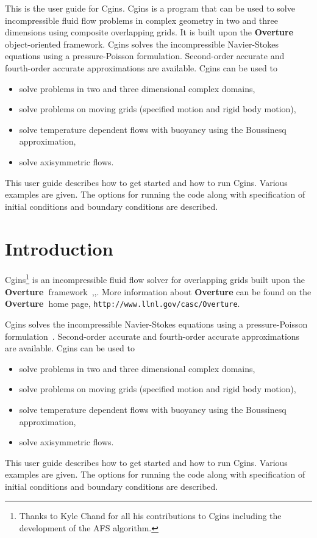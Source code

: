 \documentclass{article}
\newcommand{\Overture}{{\bf Overture\ }}
\begin{document}
\begin{flushleft}
This is the user guide for Cgins.  Cgins is a program that can be used to solve
incompressible fluid flow problems in complex geometry in two and three
dimensions using composite overlapping grids. It is built upon the \Overture
object-oriented framework.  Cgins solves the incompressible Navier-Stokes
equations using a pressure-Poisson formulation. Second-order accurate and
fourth-order accurate approximations are available.  Cgins can be used to
\begin{itemize}
  \item solve problems in two and three dimensional complex domains,
  \item solve problems on moving grids (specified motion and rigid body motion), 
  \item solve temperature dependent flows with buoyancy using the Boussinesq approximation,  
  \item solve axisymmetric flows.
\end{itemize} 
This user guide describes how to get started and how to run Cgins. Various examples are given.
The options for running the code along with specification of initial conditions and
boundary conditions are described.

\end{flushleft}

\clearpage
\tableofcontents

\clearpage
\section{Introduction}

Cgins\footnote{Thanks to Kyle Chand for all his contributions to Cgins including
the development of the AFS algorithm.} is an incompressible fluid flow solver for overlapping grids built upon
the \Overture framework~\cite{Brown97},\cite{Henshaw96a},\cite{iscope97}.
More information about
{\bf Overture} can be found on the \Overture home page, {\tt http://www.llnl.gov/\-casc/\-Overture}.


Cgins
solves the incompressible Navier-Stokes
equations using a pressure-Poisson formulation~\cite{ICSSI}. Second-order accurate and
fourth-order accurate approximations are available.  Cgins can be used to
\begin{itemize}
  \item solve problems in two and three dimensional complex domains,
  \item solve problems on moving grids (specified motion and rigid body motion), 
  \item solve temperature dependent flows with buoyancy using the Boussinesq approximation,  
  \item solve axisymmetric flows.
\end{itemize} 
This user guide describes how to get started and how to run Cgins. Various examples are given.
The options for running the code along with specification of initial conditions and
boundary conditions are described.
\end{document}
